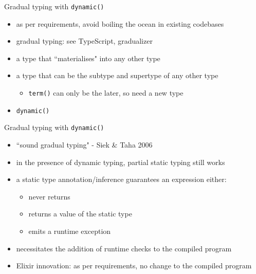 \documentclass[
  ignorenonframetext,
  aspectratio=169]{beamer}
\newcommand{\passthrough}[1]{#1}
\providecommand{\tightlist}{%
  \setlength{\itemsep}{0pt}\setlength{\parskip}{0pt}}
\begin{document}
\begin{frame}[fragile]{Gradual typing with
\passthrough{\lstinline!dynamic()!}}
\label{gradual-typing-with-dynamic}
\begin{itemize}
\tightlist
\item
  as per requirements, avoid boiling the ocean in existing codebases
\item
  gradual typing: see TypeScript, gradualizer
\item
  a type that ``materialises" into any other type
\item
  a type that can be the subtype and supertype of any other type

  \begin{itemize}
  \tightlist
  \item
    \passthrough{\lstinline!term()!} can only be the later, so need a
    new type
  \end{itemize}
\item
  \passthrough{\lstinline!dynamic()!}
\end{itemize}
\end{frame}

\begin{frame}{Gradual typing with \passthrough{\lstinline!dynamic()!}}
\label{gradual-typing-with-dynamic-1}
\begin{itemize}
\tightlist
\item
  ``sound gradual typing" - Siek \& Taha 2006
\item
  in the presence of dynamic typing, partial static typing still works
\item
  a static type annotation/inference guarantees an expression either:

  \begin{itemize}
  \tightlist
  \item
    never returns
  \item
    returns a value of the static type
  \item
    emits a runtime exception
  \end{itemize}
\item
  necessitates the addition of runtime checks to the compiled program
\item
  Elixir innovation: as per requirements, no change to the compiled
  program
\end{itemize}
\end{frame}
\end{document}
